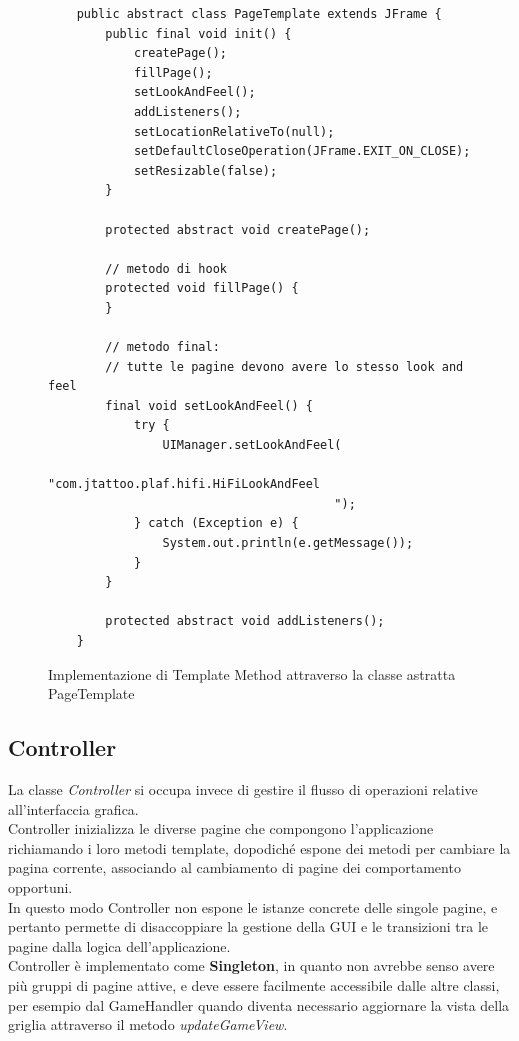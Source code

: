 \begin{figure}
    \begin{verbatim}
    public abstract class PageTemplate extends JFrame {
        public final void init() {
            createPage();
            fillPage();
            setLookAndFeel();
            addListeners();
            setLocationRelativeTo(null);
            setDefaultCloseOperation(JFrame.EXIT_ON_CLOSE);
            setResizable(false);
        }

        protected abstract void createPage();

        // metodo di hook
        protected void fillPage() {
        }

        // metodo final:
        // tutte le pagine devono avere lo stesso look and feel
        final void setLookAndFeel() {
            try {
                UIManager.setLookAndFeel(
                        "com.jtattoo.plaf.hifi.HiFiLookAndFeel
                                        ");
            } catch (Exception e) {
                System.out.println(e.getMessage());
            }
        }

        protected abstract void addListeners();
    }
    \end{verbatim}
    \caption{Implementazione di Template Method attraverso la classe astratta PageTemplate}
    \label{fig:page-template}
\end{figure}

\newpage
\subsection{Controller}\label{subsec:controller}

La classe \textit{Controller} si occupa invece di gestire il flusso di operazioni relative all'interfaccia grafica. \\
Controller inizializza le diverse pagine che compongono l'applicazione richiamando i loro metodi template, dopodiché
espone dei metodi per cambiare la pagina corrente, associando al cambiamento di pagine dei comportamento opportuni. \\
In questo modo Controller non espone le istanze concrete delle singole pagine, e pertanto permette di disaccoppiare
la gestione della GUI e le transizioni tra le pagine dalla logica dell'applicazione. \\
Controller è implementato come \textbf{Singleton}\cite{GoF}, in quanto non avrebbe senso avere più gruppi di pagine attive, e
deve essere facilmente accessibile dalle altre classi, per esempio dal GameHandler quando diventa necessario aggiornare
la vista della griglia attraverso il metodo \textit{updateGameView}. \\


